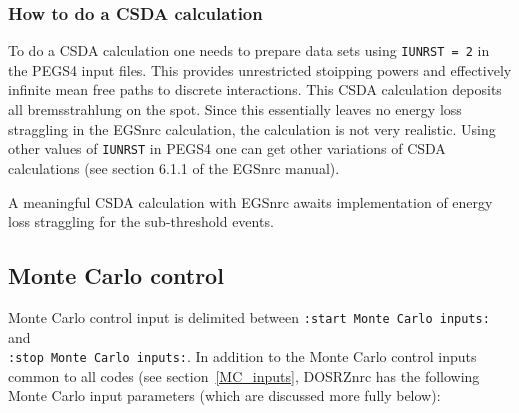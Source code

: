\documentclass[12pt,twoside]{article}  %
\begin{document}
\subsubsection{How to do a CSDA calculation}

To do a CSDA calculation one needs to prepare data sets using {\tt IUNRST =
2} in the PEGS4 input files.  This provides unrestricted stoipping powers
and effectively infinite mean free paths to discrete interactions.  This
CSDA calculation deposits all bremsstrahlung on the spot.  Since this
essentially leaves no energy loss straggling in the EGSnrc calculation, the
calculation is not very realistic.  Using other values of {\tt IUNRST} in
PEGS4 one can get other variations of CSDA calculations (see section 6.1.1
of the EGSnrc manual).

A meaningful CSDA calculation with EGSnrc awaits implementation of energy
loss straggling for the sub-threshold events.




\subsection{Monte Carlo control}

Monte Carlo control input is delimited between 
\verb+:start Monte Carlo inputs:+ and \\
\verb+:stop Monte Carlo inputs:+.  In addition to the Monte Carlo control
inputs common to all codes (see section~\ref{MC_inputs}, DOSRZnrc has the
following Monte Carlo input parameters
(which are discussed more fully below):
\end{document}
